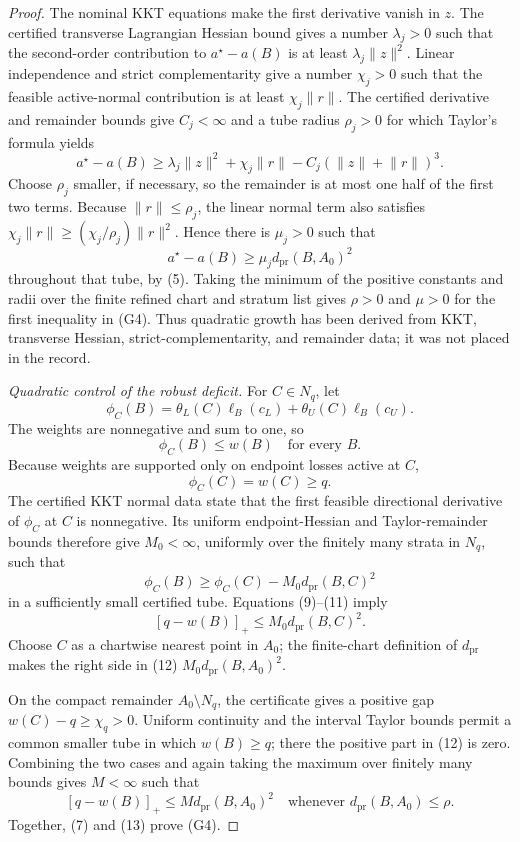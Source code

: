 \documentclass{article}
\begin{document}
\begin{proof}
The nominal KKT equations make the first derivative vanish in \(z\).  The certified transverse Lagrangian Hessian bound gives a number \(\lambda_j>0\) such that the second-order contribution to \(a^\star-a(B)\) is at least \(\lambda_j\lVert z\rVert^2\).  Linear independence and strict complementarity give a number \(\chi_j>0\) such that the feasible active-normal contribution is at least \(\chi_j\lVert r\rVert\).  The certified derivative and remainder bounds give \(C_j<\infty\) and a tube radius \(\rho_j>0\) for which Taylor's formula yields
\[
a^\star-a(B)
\ge\lambda_j\lVert z\rVert^2+\chi_j\lVert r\rVert
-C_j(\lVert z\rVert+\lVert r\rVert)^3.
\tag{6}
\]
Choose \(\rho_j\) smaller, if necessary, so the remainder is at most one half of the first two terms.  Because \(\lVert r\rVert\le\rho_j\), the linear normal term also satisfies
\(\chi_j\lVert r\rVert\ge(\chi_j/\rho_j)\lVert r\rVert^2\).  Hence there is \(\mu_j>0\) such that
\[
a^\star-a(B)\ge\mu_j d_{\mathrm{pr}}(B,A_0)^2
\tag{7}
\]
throughout that tube, by (5).  Taking the minimum of the positive constants and radii over the finite refined chart and stratum list gives \(\rho>0\) and \(\mu>0\) for the first inequality in (G4).  Thus quadratic growth has been derived from KKT, transverse Hessian, strict-complementarity, and remainder data; it was not placed in the record.

\emph{Quadratic control of the robust deficit.}
For \(C\in N_q\), let
\[
\phi_C(B)=\theta_L(C)\ell_B(c_L)+\theta_U(C)\ell_B(c_U).
\tag{8}
\]
The weights are nonnegative and sum to one, so
\[
\phi_C(B)\le w(B)
\quad\text{for every }B.
\tag{9}
\]
Because weights are supported only on endpoint losses active at \(C\),
\[
\phi_C(C)=w(C)\ge q.
\tag{10}
\]
The certified KKT normal data state that the first feasible directional derivative of \(\phi_C\) at \(C\) is nonnegative.  Its uniform endpoint-Hessian and Taylor-remainder bounds therefore give \(M_0<\infty\), uniformly over the finitely many strata in \(N_q\), such that
\[
\phi_C(B)\ge\phi_C(C)-M_0d_{\mathrm{pr}}(B,C)^2
\tag{11}
\]
in a sufficiently small certified tube.  Equations (9)--(11) imply
\[
[q-w(B)]_+\le M_0d_{\mathrm{pr}}(B,C)^2.
\tag{12}
\]
Choose \(C\) as a chartwise nearest point in \(A_0\); the finite-chart definition of \(d_{\mathrm{pr}}\) makes the right side in (12) \(M_0d_{\mathrm{pr}}(B,A_0)^2\).

On the compact remainder \(A_0\setminus N_q\), the certificate gives a positive gap \(w(C)-q\ge\chi_q>0\).  Uniform continuity and the interval Taylor bounds permit a common smaller tube in which \(w(B)\ge q\); there the positive part in (12) is zero.  Combining the two cases and again taking the maximum over finitely many bounds gives \(M<\infty\) such that
\[
[q-w(B)]_+\le Md_{\mathrm{pr}}(B,A_0)^2
\quad\text{whenever }d_{\mathrm{pr}}(B,A_0)\le\rho.
\tag{13}
\]
Together, (7) and (13) prove (G4).


\end{proof}
\end{document}
